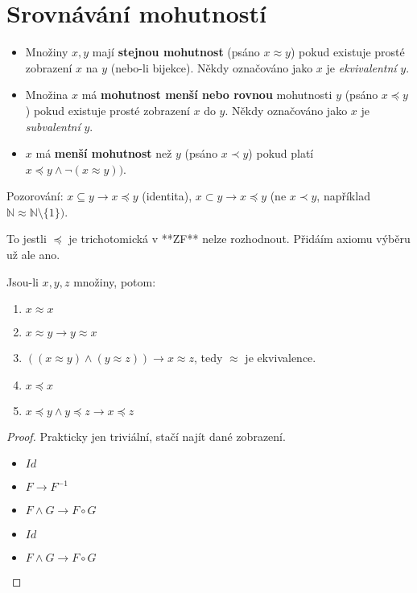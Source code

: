 \chapter{Srovnávání mohutností}

\begin{definice}
	\begin{itemize}
		\item Množiny $x,y$ mají \textbf{stejnou mohutnost} (psáno $x \approx y$) pokud existuje prosté zobrazení $x$ na $y$ (nebo-li bijekce). Někdy označováno jako $x$ je \textit{ekvivalentní} $y$.
		\item Množina $x$ má \textbf{mohutnost menší nebo rovnou} mohutnosti $y$ (psáno $x \preceq y$) pokud existuje prosté zobrazení $x$ do $y$. Někdy označováno jako $x$ je \textit{subvalentní} $y$.
		\item $x$ má \textbf{menší mohutnost} než $y$ (psáno $x \prec y$) pokud platí $x \preceq y \land \neg (x \approx y))$.
	\end{itemize}
\end{definice}

Pozorování: $x \subseteq y \rightarrow x \preceq y$ (identita),  $x \subset y \rightarrow x \preceq y$ (ne $x \prec y$, například $\mathbb{N} \approx \mathbb{N}\setminus\{1\})$.

\begin{pozn}
	To jestli $\preceq$ je trichotomická v **ZF** nelze rozhodnout. Přidáím axiomu výběru už ale ano.
\end{pozn}

\begin{lemma}
	Jsou-li $x,y,z$ množiny, potom:
	
	\begin{enumerate}
		\item $x \approx x$
		\item $x \approx y \rightarrow y \approx x$
		\item $((x \approx y) \land (y \approx z)) \rightarrow x \approx z$, tedy $\approx$ je ekvivalence.
		\item $x \preceq x$
		\item $x \preceq y \land y \preceq z \rightarrow x \preceq z$
	\end{enumerate}
\end{lemma}

\begin{proof}
	Prakticky jen triviální, stačí najít dané zobrazení.
	
	\begin{itemize}
		\item $Id$
		\item $F \rightarrow F^{-1}$
		\item $F \land G \rightarrow F \circ G$
		\item $Id$
		\item $F \land G \rightarrow F \circ G$
	\end{itemize}  
\end{proof}

